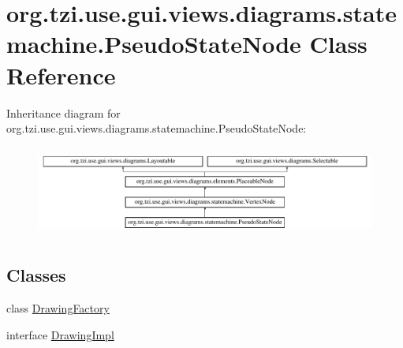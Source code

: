 \hypertarget{classorg_1_1tzi_1_1use_1_1gui_1_1views_1_1diagrams_1_1statemachine_1_1_pseudo_state_node}{\section{org.\-tzi.\-use.\-gui.\-views.\-diagrams.\-statemachine.\-Pseudo\-State\-Node Class Reference}
\label{classorg_1_1tzi_1_1use_1_1gui_1_1views_1_1diagrams_1_1statemachine_1_1_pseudo_state_node}
}
Inheritance diagram for org.\-tzi.\-use.\-gui.\-views.\-diagrams.\-statemachine.\-Pseudo\-State\-Node\-:\begin{figure}[H]
\begin{center}
\leavevmode
\includegraphics[height=3.010753cm]{classorg_1_1tzi_1_1use_1_1gui_1_1views_1_1diagrams_1_1statemachine_1_1_pseudo_state_node}
\end{center}
\end{figure}
\subsection*{Classes}
\begin{DoxyCompactItemize}
\item 
class \hyperlink{classorg_1_1tzi_1_1use_1_1gui_1_1views_1_1diagrams_1_1statemachine_1_1_pseudo_state_node_1_1_drawing_factory}{Drawing\-Factory}
\item 
interface \hyperlink{interfaceorg_1_1tzi_1_1use_1_1gui_1_1views_1_1diagrams_1_1statemachine_1_1_pseudo_state_node_1_1_drawing_impl}{Drawing\-Impl}
\end{DoxyCompactItemize}
